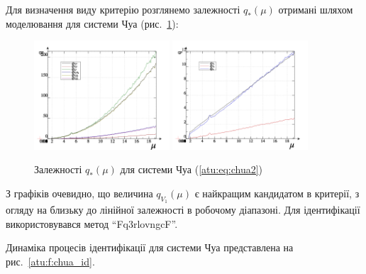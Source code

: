 \documentclass[a4paper,13pt]{atuaref}
\DeclareMathOperator*{\sign}{sign}
\begin{document}
Для визначення виду критерію розглянемо залежності $ q_{*}(\mu)$ отримані
шляхом моделювання для системи Чуа (рис.~\ref{atu:f:chua_q}):

\begin{figure}[htb!]
\centerline{
  \includegraphics[width=0.45\textwidth]{p5/p/cha/chua/chua_q-p_mu2.png}
  \includegraphics[width=0.45\textwidth]{p5/p/cha/chua/chua_q-p_mu1.png}
}
  \caption{Залежності $q_{*}(\mu) $ для системи Чуа (\ref{atu:eq:chua2})}
\label{atu:f:chua_q}
\end{figure}

З графіків очевидно, що величина $ q_{V_1} (\mu) $
є найкращим кандидатом в критерії, з огляду на близьку до лінійної залежності в робочому діапазоні.
%
Для ідентифікації використовувався метод ``Fq3rlovngcF''.

Динаміка процесів ідентифікації для системи Чуа представлена на рис.~\ref{atu:f:chua_id}.
\end{document}
